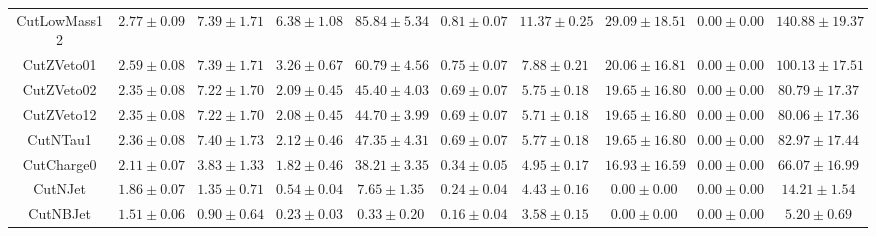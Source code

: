 \documentclass[11pt]{article}
\begin{document}
{\begin{tabular}{|c|c|c|c|c|c|c|c|c|c|}
			CutLowMass12  &  $2.77 \pm 0.09$ &     $7.39 \pm 1.71$ &  $6.38 \pm 1.08$ &    $85.84 \pm 5.34$ &  $0.81 \pm 0.07$ & $11.37 \pm 0.25$ &      $29.09 \pm 18.51$ &     $0.00 \pm 0.00$ &      $140.88 \pm 19.37$\\
			CutZVeto01    &  $2.59 \pm 0.08$ &     $7.39 \pm 1.71$ &  $3.26 \pm 0.67$ &    $60.79 \pm 4.56$ &  $0.75 \pm 0.07$ &  $7.88 \pm 0.21$ &      $20.06 \pm 16.81$ &     $0.00 \pm 0.00$ &      $100.13 \pm 17.51$\\
			CutZVeto02    &  $2.35 \pm 0.08$ &     $7.22 \pm 1.70$ &  $2.09 \pm 0.45$ &    $45.40 \pm 4.03$ &  $0.69 \pm 0.07$ &  $5.75 \pm 0.18$ &      $19.65 \pm 16.80$ &     $0.00 \pm 0.00$ &       $80.79 \pm 17.37$\\
			CutZVeto12    &  $2.35 \pm 0.08$ &     $7.22 \pm 1.70$ &  $2.08 \pm 0.45$ &    $44.70 \pm 3.99$ &  $0.69 \pm 0.07$ &  $5.71 \pm 0.18$ &      $19.65 \pm 16.80$ &     $0.00 \pm 0.00$ &       $80.06 \pm 17.36$\\
			CutNTau1      &  $2.36 \pm 0.08$ &     $7.40 \pm 1.73$ &  $2.12 \pm 0.46$ &    $47.35 \pm 4.31$ &  $0.69 \pm 0.07$ &  $5.77 \pm 0.18$ &      $19.65 \pm 16.80$ &     $0.00 \pm 0.00$ &       $82.97 \pm 17.44$\\
			CutCharge0    &  $2.11 \pm 0.07$ &     $3.83 \pm 1.33$ &  $1.82 \pm 0.46$ &    $38.21 \pm 3.35$ &  $0.34 \pm 0.05$ &  $4.95 \pm 0.17$ &      $16.93 \pm 16.59$ &     $0.00 \pm 0.00$ &       $66.07 \pm 16.99$\\
			CutNJet       &  $1.86 \pm 0.07$ &     $1.35 \pm 0.71$ &  $0.54 \pm 0.04$ &     $7.65 \pm 1.35$ &  $0.24 \pm 0.04$ &  $4.43 \pm 0.16$ &        $0.00 \pm 0.00$ &     $0.00 \pm 0.00$ &        $14.21 \pm 1.54$\\
			CutNBJet      &  $1.51 \pm 0.06$ &     $0.90 \pm 0.64$ &  $0.23 \pm 0.03$ &     $0.33 \pm 0.20$ &  $0.16 \pm 0.04$ &  $3.58 \pm 0.15$ &        $0.00 \pm 0.00$ &     $0.00 \pm 0.00$ &         $5.20 \pm 0.69$\\
			\hline
			\end{tabular}}
\end{document}
